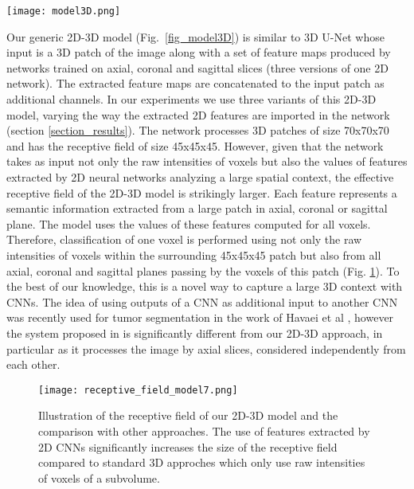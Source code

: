 \documentclass[preprint,12pt]{elsarticle}
\begin{document}
\begin{figure*}[b!]
\centering
\texttt{[image: model3D.png]}
\caption{Architecture of the main 2D-3D model used in our experiments (named '2D-3D model A' in the remainder). The number of feature maps in the last convolutional layer is equal to the number of classes (4 in our case).}
\label{fig_model3D}
\end{figure*}

Our generic 2D-3D model (Fig.~\ref{fig_model3D}) is similar to 3D U-Net \cite{cciccek20163d} whose input is a 3D patch of the image along with a set of feature maps produced by networks trained on axial, coronal and sagittal slices (three versions of one 2D network). The extracted feature maps are concatenated to the input patch as additional channels. In our experiments we use three variants of this 2D-3D model, varying the way the extracted 2D features are imported in the network (section \ref{section_results}). The network processes 3D patches of size 70x70x70 and has the receptive field of size 45x45x45. However, given that the network takes as input not only the raw intensities of voxels but also the values of features extracted by 2D neural networks analyzing a large spatial context, the effective receptive field of the 2D-3D model is strikingly larger. Each feature represents a semantic information extracted from a large patch in axial, coronal or sagittal plane. The model uses the values of these features computed for all voxels. Therefore, classification of one voxel is performed using not only the raw intensities of voxels within the surrounding 45x45x45 patch but also from all axial, coronal and sagittal planes passing by the voxels of this patch (Fig. \ref{fig_receptive_field}). To the best of our knowledge, this is a novel way to capture a large 3D context with CNNs. The idea of using outputs of a CNN as additional input to another CNN was recently used for tumor segmentation in the work of Havaei et al \cite{havaei2017brain}, however the system proposed in \cite{havaei2017brain} is significantly different from our 2D-3D approach, in particular as it processes the image by axial slices, considered independently from each other.
\begin{figure}[h!]
\centering
\texttt{[image: receptive\_field\_model7.png]}
\caption{Illustration of the receptive field of our 2D-3D model and the comparison with other approaches. The use of features extracted by 2D CNNs significantly increases the size of the receptive field compared to standard 3D approches which only use raw intensities of voxels of a subvolume.}
\label{fig_receptive_field}
\end{figure}
\end{document}
